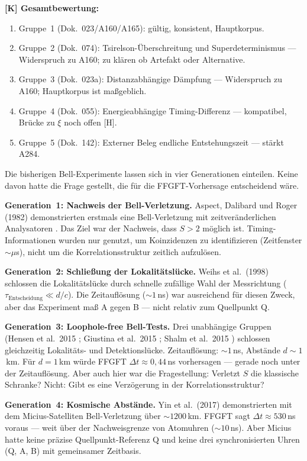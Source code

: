 \textbf{[K] Gesamtbewertung:}
\begin{enumerate}[leftmargin=1.6em,itemsep=0.2em]
  \item Gruppe~1 (Dok.~023/A160/A165): gültig, konsistent, Hauptkorpus.
  \item Gruppe~2 (Dok.~074): Tsirelson-Überschreitung und Superdeterminismus
    --- Widerspruch zu A160; zu klären ob Artefakt oder Alternative.
  \item Gruppe~3 (Dok.~023a): Distanzabhängige Dämpfung --- Widerspruch
    zu A160; Hauptkorpus ist maßgeblich.
  \item Gruppe~4 (Dok.~055): Energieabhängige Timing-Differenz ---
    kompatibel, Brücke zu $\xi$ noch offen [H].
  \item Gruppe~5 (Dok.~142): Externer Beleg endliche Entstehungszeit ---
    stärkt A284.
\end{enumerate}

Die bisherigen Bell-Experimente lassen sich in vier Generationen einteilen.
Keine davon hatte die Frage gestellt, die für die FFGFT-Vorhersage
entscheidend wäre.

\textbf{Generation~1: Nachweis der Bell-Verletzung.}
Aspect, Dalibard und Roger (1982) demonstrierten erstmals eine Bell-Verletzung
mit zeitveränderlichen Analysatoren \cite{Aspect1982}. Das Ziel war der
Nachweis, dass $S > 2$ möglich ist. Timing-Informationen wurden nur genutzt,
um Koinzidenzen zu identifizieren (Zeitfenster $\sim \mu$s), nicht um
die Korrelationsstruktur zeitlich aufzulösen.

\textbf{Generation~2: Schließung der Lokalitätslücke.}
Weihs et al.\ (1998) \cite{Weihs1998} schlossen die Lokalitätslücke durch
schnelle zufällige Wahl der Messrichtung ($\tau_\text{Entscheidung} \ll d/c$).
Die Zeitauflösung ($\sim 1$\,ns) war ausreichend für diesen Zweck, aber das
Experiment maß A gegen B --- nicht relativ zum Quellpunkt Q.

\textbf{Generation~3: Loophole-free Bell-Tests.}
Drei unabhängige Gruppen (Hensen et al.\ 2015 \cite{Hensen2015};
Giustina et al.\ 2015 \cite{Giustina2015}; Shalm et al.\ 2015 \cite{Shalm2015})
schlossen gleichzeitig Lokalitäts- und Detektionslücke.
Zeitauflösung: $\sim 1$\,ns, Abstände $d \sim 1$\,km.
Für $d = 1$\,km würde FFGFT $\Delta t \approx 0{,}44$\,ns vorhersagen ---
gerade noch unter der Zeitauflösung. Aber auch hier war die Fragestellung:
Verletzt $S$ die klassische Schranke? Nicht: Gibt es eine Verzögerung
in der Korrelationsstruktur?

\textbf{Generation~4: Kosmische Abstände.}
Yin et al.\ (2017) \cite{Yin2017} demonstrierten mit dem Micius-Satelliten
Bell-Verletzung über $\sim 1200$\,km. FFGFT sagt $\Delta t \approx 530$\,ns
voraus --- weit über der Nachweisgrenze von Atomuhren ($\sim 10$\,ns).
Aber Micius hatte keine präzise Quellpunkt-Referenz Q und keine drei
synchronisierten Uhren (Q, A, B) mit gemeinsamer Zeitbasis.

